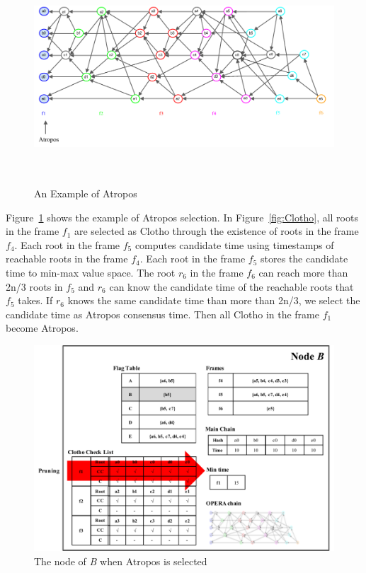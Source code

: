 \documentclass{article}
\begin{document}
\begin{figure}[H] \centering  
	\includegraphics[height=8cm, width=1.0\columnwidth]{Atropos_fig1.pdf}
	\caption{An Example of Atropos}
	\label{fig:Atropos}
\end{figure}

Figure~\ref{fig:Atropos} shows the example of Atropos selection. In  Figure~\ref{fig:Clotho}, all roots in the frame $f_1$ are selected as Clotho through the existence of roots in the frame $f_4$. Each root in the frame $f_5$ computes candidate time using timestamps of reachable roots in the frame $f_4$. Each root in the frame $f_5$ stores the candidate time to min-max value space. The root $r_6$ in the frame $f_6$ can reach more than 2n/3 roots in $f_5$ and $r_6$ can know the candidate time of the reachable roots that $f_5$ takes. If $r_6$ knows  the same candidate time than more than 2n/3, we select the candidate time as Atropos consensus time. Then all Clotho in the frame $f_1$ become Atropos. 

\newpage

\begin{figure}[H] \centering  
	\includegraphics[width=0.8\columnwidth]{Atropos_fig2.pdf}
	\caption{The node of \textit{B} when Atropos is selected}
	\label{fig:Atropos_Node}
\end{figure}
\end{document}
